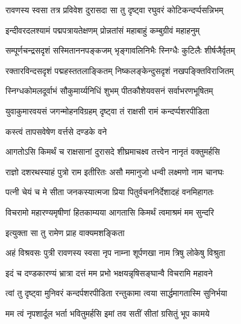 \twolineshloka
{रावणस्य स्वसा तत्र प्रविवेश दुरासदा}
{सा तु दृष्ट्वा रघुवरं कोटिकन्दर्प्पसन्निभम्}%

\twolineshloka
{इन्दीवरदलश्यामं पद्मपत्रायतेक्षणम्}
{प्रोन्नतांसं महाबाहुं कम्बुग्रीवं महाहनुम्}%

\twolineshloka
{सम्पूर्णचन्द्रसदृशं सस्मिताननपङ्कजम्}
{भृङ्गावलिनिभैः स्निग्धैः कुटिलैः शीर्षजैर्वृतम्}%

\twolineshloka
{रक्तारविन्दसदृशं पद्महस्ततलाङ्कितम्}
{निष्कलङ्केन्दुसदृशं नखपङ्क्तिविराजितम्}%

\twolineshloka
{स्निग्धकोमलदूर्वाभं सौकुमार्य्यनिधिं शुभम्}
{पीतकौशेयवसनं सर्वाभरणभूषितम्}%

\twolineshloka
{युवाकुमारवयसं जगन्मोहनविग्रहम्}
{दृष्ट्वा तं राक्षसी रामं कन्दर्प्पशरपीडिता}%


\onelineshloka
{कस्त्वं तापसवेषेण वर्त्तसे दण्डके वने}%

\twolineshloka
{आगतोऽसि किमर्थं च राक्षसानां दुरासदे}
{शीघ्रमाचक्ष्व तत्त्वेन नानृतं वक्तुमर्हसि}%




\twolineshloka
{राज्ञो दशरथस्याहं पुत्रो राम इतीरितः}
{असौ ममानुजो धन्वी लक्ष्मणो नाम चानघः}%

\twolineshloka
{पत्नी चेयं च मे सीता जनकस्यात्मजा प्रिया}
{पितुर्वचननिर्देशादहं वनमिहागतः}%

\twolineshloka
{विचरामो महारण्यमृषीणां हितकाम्यया}
{आगतासि किमर्थं त्वमाश्रमं मम सुन्दरि}%


\onelineshloka
{इत्युक्ता सा तु रामेण प्राह वाक्यमशङ्किता}%


\twolineshloka
{अहं विश्रवसः पुत्री रावणस्य स्वसा नृप}
{नाम्ना शूर्पणखा नाम त्रिषु लोकेषु विश्रुता}%

\twolineshloka
{इदं च दण्डकारण्यं भ्रात्रा दत्तं मम प्रभो}
{भक्षयन्नृषिसङ्घान्वै विचरामि महावने}%

\twolineshloka
{त्वां तु दृष्ट्वा मुनिवरं कन्दर्पशरपीडिता}
{रन्तुकामा त्वया सार्द्धमागतास्मि सुनिर्भया}%

\twolineshloka
{मम त्वं नृपशार्दूल भर्ता भवितुमर्हसि}
{इमां तव सतीं सीतां ग्रसितुं भूप कामये}%

